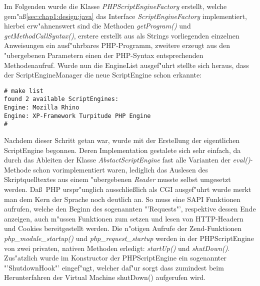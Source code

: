 Im Folgenden wurde die Klasse \emph{PHPScriptEngineFactory} erstellt, welche gem"a\ss \ref{sec:chap1:design:java} 
das Interface \emph{ScriptEngineFactory} implementiert, hierbei erw"ahnenswert sind die Methoden 
\emph{getProgram()} und \emph{getMethodCallSyntax()}, erstere erstellt aus als Strings vorliegenden
einzelnen Anweisungen ein ausf"uhrbares PHP-Programm, zweitere erzeugt aus den "ubergebenen Parametern
einen der PHP-Syntax entsprechenden Methodenaufruf. Wurde nun die EngineList ausgef"uhrt stellte sich heraus,
dass der ScriptEngineManager die neue ScriptEngine schon erkannte:
\begin{lstlisting}[caption=Neue ScriptEngine]
# make list
found 2 available ScriptEngines:
Engine: Mozilla Rhino
Engine: XP-Framework Turpitude PHP Engine
#
\end{lstlisting}

Nachdem dieser Schritt getan war, wurde mit der Erstellung der eigentlichen ScriptEngine begonnen. Deren
Implementation gestalete sich sehr einfach, da durch das Ableiten der Klasse \emph{AbstactScriptEngine} 
fast alle Varianten der \emph{eval()}-Methode schon vorimplementiert waren, lediglich das Auslesen des
Skriptquelltextes aus einem "ubergebenen \emph{Reader} musste selbst umgesetzt werden. 
Da\ss\ PHP urspr"unglich ausschlie\ss lich als CGI ausgef"uhrt wurde merkt man dem Kern der Sprache noch
deutlich an. So muss eine SAPI Funktionen aufrufen, welche den Beginn des sogenannten "'Requests"', respektive
dessen Ende anzeigen, auch m"ussen Funktionen zum setzen und lesen von HTTP-Headern und Cookies bereitgestellt
werden. Die n"otigen Aufrufe der Zend-Funktionen \emph{php\_module\_startup()} und \emph{php\_request\_startup}
werden in der PHPScriptEngine von zwei privaten, nativen Methoden erledigt: \emph{startUp()} und \emph{shutDown()}. 
Zus"atzlich wurde im Konstructor der PHPScriptEngine ein sogenannter "'ShutdownHook"' eingef"ugt, welcher daf"ur 
sorgt dass zumindest beim Herunterfahren der Virtual Machine shutDown() aufgerufen wird.

